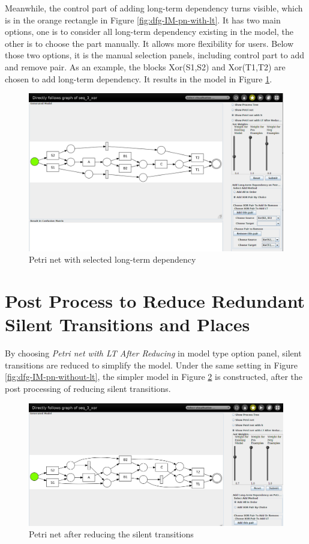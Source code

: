 Meanwhile, the control part of adding long-term dependency turns visible, which is in the orange rectangle in Figure \ref{fig:dfg-IM-pn-with-lt}.  It has two main options, one is to consider all long-term dependency existing in the model, the other is to choose the part manually. It allows more flexibility for users. Below those two options, it is the manual selection panels, including control part to add and remove pair. As an example, the blocks Xor(S1,S2) and Xor(T1,T2) are chosen to add long-term dependency. It results in the model in Figure \ref{fig:dfg-IM-pn-with-lt-m}. 
\begin{figure}
	\centering
	\includegraphics[width=\textwidth]{figures/implementation/dfg-IM-pn-with-lt-manual.png}
	\caption{Petri net with selected long-term dependency}
	\label{fig:dfg-IM-pn-with-lt-m}
\end{figure}
\section{Post Process to Reduce Redundant Silent Transitions and Places}
By choosing \emph{Petri net with LT After Reducing} in model type option panel, silent transitions are reduced to simplify the model.
Under the same setting in Figure \ref{fig:dfg-IM-pn-without-lt}, the simpler model in Figure \ref{fig:dfg-IM-pn-with-lt-r} is constructed, after the post processing of reducing silent transitions.
\begin{figure}
	\centering
	\includegraphics[width=\textwidth]{figures/implementation/dfg-IM-pn-with-lt-reduced.png}
	\caption{Petri net after reducing the silent transitions}
	\label{fig:dfg-IM-pn-with-lt-r}
\end{figure}

